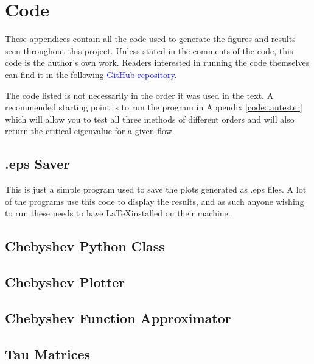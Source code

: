\chapter{Code}

These appendices contain all the code used to generate the figures and results seen throughout this project. Unless stated in the comments of the code, this code is the author's own work. Readers interested in running the code themselves can find it in the following  \href{https://github.com/OscarRummery/projectIV}{\textcolor{blue}{GitHub repository}}.

The code listed is not necessarily in the order it was used in the text. A recommended starting point is to run the  program in Appendix \ref{code:tautester} which will allow you to test all three methods of different orders and will also return the critical eigenvalue for a given flow.

\section{.eps Saver}
This is just a simple program used to save the plots generated as .eps files. A lot of the programs use this code to display the results, and as such anyone wishing to run these needs to have \LaTeX installed on their machine. 


\newpage

\section{Chebyshev Python Class} \label{code:chebyshevclass}

\newpage

\section{Chebyshev Plotter} \label{code:chebyshevplotter}
\label{code:chebyplotter}

\newpage

\section{Chebyshev Function Approximator} \label{code:funcapprox}

\newpage

\section{Tau Matrices} \label{code:tau_matrices}

\newpage

